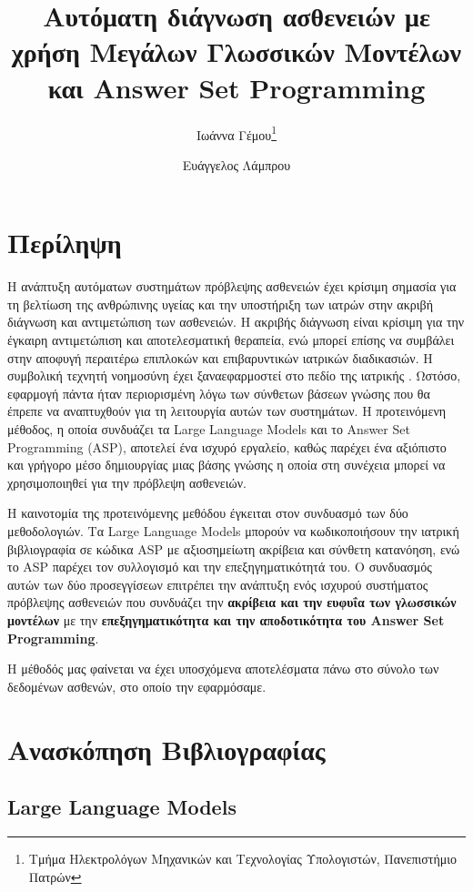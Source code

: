 \documentclass[12pt]{extarticle}
\title{Αυτόματη διάγνωση ασθενειών με χρήση Μεγάλων Γλωσσικών Μοντέλων και Answer Set Programming}
\author{Ιωάννα Γέμου\thanks{Τμήμα Ηλεκτρολόγων Μηχανικών και Τεχνολογίας Υπολογιστών, Πανεπιστήμιο Πατρών} \\ \src{ioannagemou@upnet.gr} \and Ευάγγελος Λάμπρου\footnotemark[1] \\ \src{e.lamprou@upnet.gr}}
\begin{document}
\maketitle
\tableofcontents
\newpage
\section{Περίληψη}
Η ανάπτυξη αυτόματων συστημάτων πρόβλεψης ασθενειών έχει κρίσιμη σημασία για τη βελτίωση της ανθρώπινης υγείας και την υποστήριξη των ιατρών στην ακριβή διάγνωση και αντιμετώπιση των ασθενειών. Η ακριβής διάγνωση είναι κρίσιμη για την έγκαιρη αντιμετώπιση και αποτελεσματική θεραπεία, ενώ μπορεί επίσης να συμβάλει στην αποφυγή περαιτέρω επιπλοκών και επιβαρυντικών ιατρικών διαδικασιών. 
Η συμβολική τεχνητή νοημοσύνη έχει ξαναεφαρμοστεί στο πεδίο της ιατρικής \cite{Alviano_2020}. Ωστόσο,
εφαρμογή πάντα ήταν περιορισμένη λόγω των σύνθετων βάσεων γνώσης που θα έπρεπε να αναπτυχθούν για τη λειτουργία 
αυτών των συστημάτων.
Η προτεινόμενη μέθοδος, η οποία συνδυάζει τα Large Language Models και το Answer Set Programming (ASP), αποτελεί ένα ισχυρό εργαλείο, καθώς παρέχει ένα αξιόπιστο και γρήγορο μέσο δημιουργίας μιας βάσης γνώσης η οποία 
στη συνέχεια μπορεί να χρησιμοποιηθεί για την πρόβλεψη ασθενειών.



Η καινοτομία της προτεινόμενης μεθόδου έγκειται στον συνδυασμό των δύο μεθοδολογιών. Τα Large Language Models μπορούν να κωδικοποιήσουν την ιατρική βιβλιογραφία 
σε κώδικα ASP με αξιοσημείωτη ακρίβεια και σύνθετη κατανόηση, ενώ το ASP παρέχει τον συλλογισμό και την επεξηγηματικότητά του. Ο συνδυασμός αυτών των δύο προσεγγίσεων επιτρέπει την ανάπτυξη ενός ισχυρού συστήματος πρόβλεψης ασθενειών που συνδυάζει την \textbf{ακρίβεια και την ευφυΐα των γλωσσικών μοντέλων} με την \textbf{επεξηγηματικότητα και την αποδοτικότητα του Answer Set Programming}.

Η μέθοδός μας φαίνεται να έχει υποσχόμενα αποτελέσματα πάνω στο σύνολο των δεδομένων ασθενών, στο οποίο
την εφαρμόσαμε.





\section{Ανασκόπηση Βιβλιογραφίας}

\subsection{Large Language Models}
\end{document}
